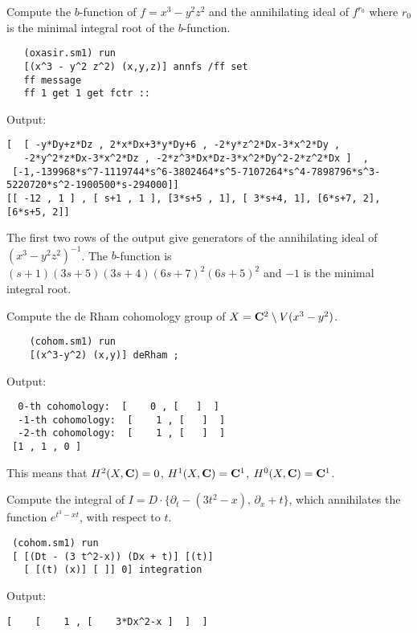 \begin{example} \rm
Compute the $b$-function of  $f=x^3-y^2 z^2$
and the annihilating ideal of $f^{r_0}$ where
$r_0$ is the minimal integral root of the $b$-function.
\begin{verbatim}
   (oxasir.sm1) run
   [(x^3 - y^2 z^2) (x,y,z)] annfs /ff set
   ff message
   ff 1 get 1 get fctr ::
\end{verbatim}
{\footnotesize
Output:
\begin{verbatim}
[  [ -y*Dy+z*Dz , 2*x*Dx+3*y*Dy+6 , -2*y*z^2*Dx-3*x^2*Dy , 
   -2*y^2*z*Dx-3*x^2*Dz , -2*z^3*Dx*Dz-3*x^2*Dy^2-2*z^2*Dx ]  , 
 [-1,-139968*s^7-1119744*s^6-3802464*s^5-7107264*s^4-7898796*s^3-5220720*s^2-1900500*s-294000]] 
[[ -12 , 1 ] , [ s+1 , 1 ], [3*s+5 , 1], [ 3*s+4, 1], [6*s+7, 2], [6*s+5, 2]] 
\end{verbatim}
}
The first two rows of the output give generators of the annihilating
ideal of
$(x^3-y^2 z^2)^{-1}$.
The $b$-function is
$(s+1)(3s+5)(3s+4)(6s+7)^2(6s+5)^2$
and $-1$ is the minimal integral root.
\end{example}


\begin{example} \rm
Compute the de Rham cohomology group 
of $X={\bf C}^2 \setminus V(x^3-y^2)$.
\begin{verbatim}
    (cohom.sm1) run
    [(x^3-y^2) (x,y)] deRham ;
\end{verbatim}
{\footnotesize
Output:
\begin{verbatim}
  0-th cohomology:  [    0 , [   ]  ] 
  -1-th cohomology:  [    1 , [   ]  ] 
  -2-th cohomology:  [    1 , [   ]  ] 
 [1 , 1 , 0 ]
\end{verbatim}
}
This means that $H^2(X,{\bf C}) = 0$,
$H^1(X,{\bf C}) = {\bf C}^1$,
$H^0(X,{\bf C}) = {\bf C}^1$.
\end{example}

\begin{example} \rm
Compute the integral of
$ I=D\cdot \{\partial_t -(3 t^2-x) ,\,  \partial_x+t \}$,
which annihilates the function $e^{t^3-x t}$,
with respect to $t$.
\begin{verbatim}
 (cohom.sm1) run
 [ [(Dt - (3 t^2-x)) (Dx + t)] [(t)]
   [ [(t) (x)] [ ]] 0] integration
\end{verbatim}
{\footnotesize Output:
\begin{verbatim}
[    [    1 , [    3*Dx^2-x ]  ]  ]
\end{verbatim} }

\end{example}



